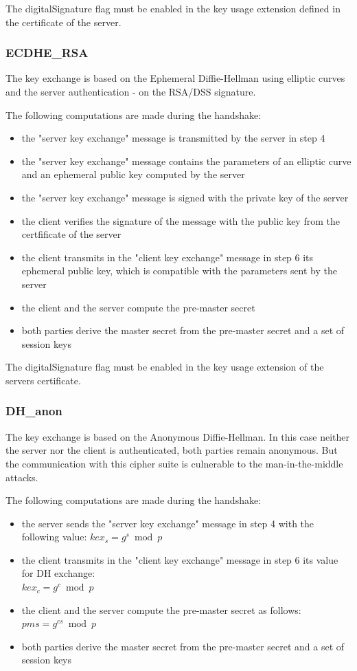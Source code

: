 The digitalSignature flag must be enabled in the key usage extension defined in the certificate of the server.

\subsubsection*{ECDHE\_RSA}
The key exchange is based on the Ephemeral Diffie-Hellman using elliptic curves and the server authentication - on the RSA/DSS signature.

The following computations are made during the handshake:
\begin{itemize}
	\item the "server key exchange" message is transmitted by the server in step 4 
	\item the "server key exchange" message contains the parameters of an elliptic curve and an ephemeral public key computed by the server
	\item the "server key exchange" message is signed with the private key of the server
	\item the client verifies the signature of the message with the public key from the certfificate of the server
	\item the client transmits in the "client key exchange" message in step 6 its ephemeral public key, which is compatible with the parameters sent by the server
	\item the client and the server compute the pre-master secret
	\item both parties derive the master secret from the pre-master secret and a set of session keys
\end{itemize}

The digitalSignature flag must be enabled in the key usage extension of the servers certificate.

\subsubsection*{DH\_anon}
The key exchange is based on the Anonymous Diffie-Hellman. In this case neither the server nor the client is authenticated, both parties remain anonymous. But the communication with this cipher suite is culnerable to the man-in-the-middle attacks.

The following computations are made during the handshake:
\begin{itemize}
	\item the server sends the "server key exchange" message in step 4 with the following value: $\displaystyle kex_s = g^s \bmod p $ 
	\item the client transmits in the "client key exchange" message in step 6 its value for DH exchange: \\ $\displaystyle kex_c = g^c \bmod p $ 
	\item the client and the server compute the pre-master secret as follows: $\displaystyle pms = g^{cs} \bmod p$
	\item both parties derive the master secret from the pre-master secret and a set of session keys
\end{itemize}


